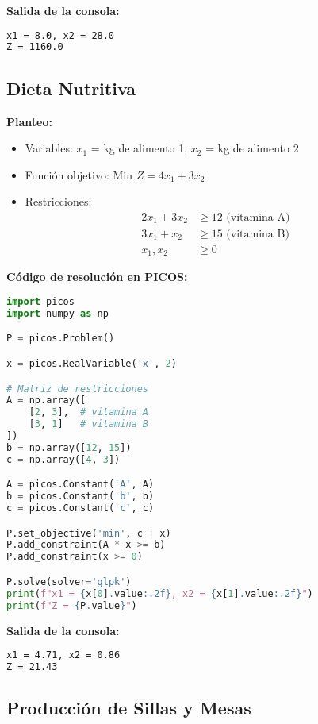 \documentclass[12pt]{article}
\begin{document}
\textbf{Salida de la consola:}
\begin{lstlisting}[language=bash,backgroundcolor=\color{black},basicstyle=\color{white}\ttfamily,numbers=none]
x1 = 8.0, x2 = 28.0
Z = 1160.0
\end{lstlisting}

\subsection{Dieta Nutritiva}

\textbf{Planteo:}
\begin{itemize}
\item Variables: $x_1$ = kg de alimento 1, $x_2$ = kg de alimento 2
\item Función objetivo: Min $Z = 4x_1 + 3x_2$
\item Restricciones:
  \begin{align*}
  2x_1 + 3x_2 &\geq 12 \text{ (vitamina A)} \\
  3x_1 + x_2 &\geq 15 \text{ (vitamina B)} \\
  x_1, x_2 &\geq 0
  \end{align*}
\end{itemize}

\textbf{Código de resolución en PICOS:}
\begin{lstlisting}[language=Python]
import picos
import numpy as np

P = picos.Problem()

x = picos.RealVariable('x', 2)

# Matriz de restricciones
A = np.array([
    [2, 3],  # vitamina A
    [3, 1]   # vitamina B
])
b = np.array([12, 15])
c = np.array([4, 3])

A = picos.Constant('A', A)
b = picos.Constant('b', b)
c = picos.Constant('c', c)

P.set_objective('min', c | x)
P.add_constraint(A * x >= b)
P.add_constraint(x >= 0)

P.solve(solver='glpk')
print(f"x1 = {x[0].value:.2f}, x2 = {x[1].value:.2f}")
print(f"Z = {P.value}")
\end{lstlisting}

\textbf{Salida de la consola:}
\begin{lstlisting}[language=bash,backgroundcolor=\color{black},basicstyle=\color{white}\ttfamily,numbers=none]
x1 = 4.71, x2 = 0.86
Z = 21.43
\end{lstlisting}

\subsection{Producción de Sillas y Mesas}
\end{document}

